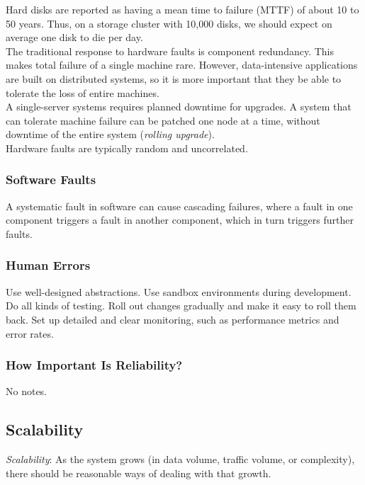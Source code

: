 \documentclass[12pt, titlepage]{article}
\begin{document}
Hard disks are reported as having a mean time to failure (MTTF) of about 10 to 50 years. Thus, on a storage cluster with 10,000 disks, we should expect on average one disk to die per day. \\

The traditional response to hardware faults is component redundancy. This makes total failure of a single machine rare. However, data-intensive applications are built on distributed systems, so it is more important that they be able to tolerate the loss of entire machines. \\

A single-server systems requires planned downtime for upgrades. A system that can tolerate machine failure can be patched one node at a time, without downtime of the entire system (\textit{rolling upgrade}). \\

Hardware faults are typically random and uncorrelated.

\subsubsection{Software Faults}

A systematic fault in software can cause cascading failures, where a fault in one component triggers a fault in another component, which in turn triggers further faults.

\subsubsection{Human Errors}

Use well-designed abstractions. Use sandbox environments during development. Do all kinds of testing. Roll out changes gradually and make it easy to roll them back. Set up detailed and clear monitoring, such as performance metrics and error rates.

\subsubsection{How Important Is Reliability?}

No notes.

\subsection{Scalability}

\textit{Scalability}: As the system grows (in data volume, traffic volume, or complexity), there should be reasonable ways of dealing with that growth. \\
\end{document}
